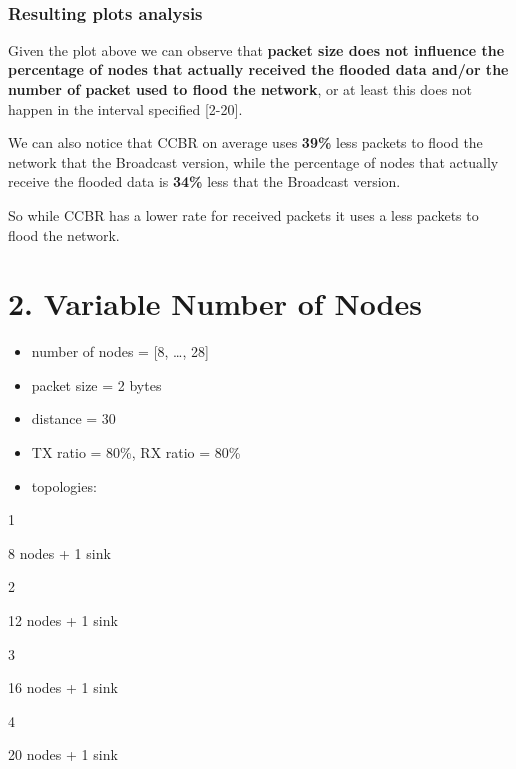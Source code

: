 \documentclass[11pt]{article}
\providecommand{\tightlist}{%
      \setlength{\itemsep}{0pt}\setlength{\parskip}{0pt}}
\begin{document}
    \begin{center}
    \end{center}
    { \hspace*{\fill} \\}
    
    \hypertarget{resulting-plots-analysis}{%
\subsubsection{Resulting plots
analysis}\label{resulting-plots-analysis}}

Given the plot above we can observe that \textbf{packet size does not
influence the percentage of nodes that actually received the flooded
data and/or the number of packet used to flood the network}, or at least
this does not happen in the interval specified {[}2-20{]}.

We can also notice that CCBR on average uses \textbf{39\%} less packets
to flood the network that the Broadcast version, while the percentage of
nodes that actually receive the flooded data is \textbf{34\%} less that
the Broadcast version.

So while CCBR has a lower rate for received packets it uses a less
packets to flood the network.

    \hypertarget{variable-number-of-nodes}{%
\section{2. Variable Number of Nodes}\label{variable-number-of-nodes}}

\begin{itemize}
\tightlist
\item
  number of nodes = {[}8, \ldots{}, 28{]}
\item
  packet size = 2 bytes
\item
  distance = 30
\item
  TX ratio = 80\%, RX ratio = 80\%
\item
  topologies:
\end{itemize}

1

8 nodes + 1 sink

2

12 nodes + 1 sink

3

16 nodes + 1 sink

4

20 nodes + 1 sink
\end{document}

